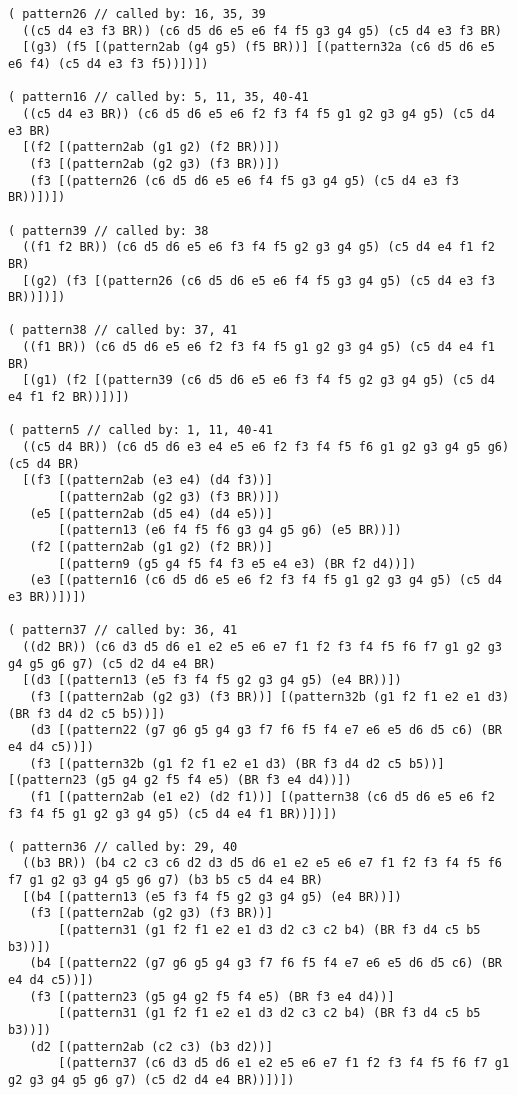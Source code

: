 {\begin{verbatim}
( pattern26 // called by: 16, 35, 39
  ((c5 d4 e3 f3 BR)) (c6 d5 d6 e5 e6 f4 f5 g3 g4 g5) (c5 d4 e3 f3 BR)
  [(g3) (f5 [(pattern2ab (g4 g5) (f5 BR))] [(pattern32a (c6 d5 d6 e5 e6 f4) (c5 d4 e3 f3 f5))])])

( pattern16 // called by: 5, 11, 35, 40-41
  ((c5 d4 e3 BR)) (c6 d5 d6 e5 e6 f2 f3 f4 f5 g1 g2 g3 g4 g5) (c5 d4 e3 BR)
  [(f2 [(pattern2ab (g1 g2) (f2 BR))])
   (f3 [(pattern2ab (g2 g3) (f3 BR))])
   (f3 [(pattern26 (c6 d5 d6 e5 e6 f4 f5 g3 g4 g5) (c5 d4 e3 f3 BR))])])

( pattern39 // called by: 38
  ((f1 f2 BR)) (c6 d5 d6 e5 e6 f3 f4 f5 g2 g3 g4 g5) (c5 d4 e4 f1 f2 BR)
  [(g2) (f3 [(pattern26 (c6 d5 d6 e5 e6 f4 f5 g3 g4 g5) (c5 d4 e3 f3 BR))])])

( pattern38 // called by: 37, 41
  ((f1 BR)) (c6 d5 d6 e5 e6 f2 f3 f4 f5 g1 g2 g3 g4 g5) (c5 d4 e4 f1 BR)
  [(g1) (f2 [(pattern39 (c6 d5 d6 e5 e6 f3 f4 f5 g2 g3 g4 g5) (c5 d4 e4 f1 f2 BR))])])

( pattern5 // called by: 1, 11, 40-41
  ((c5 d4 BR)) (c6 d5 d6 e3 e4 e5 e6 f2 f3 f4 f5 f6 g1 g2 g3 g4 g5 g6) (c5 d4 BR)
  [(f3 [(pattern2ab (e3 e4) (d4 f3))]
       [(pattern2ab (g2 g3) (f3 BR))])
   (e5 [(pattern2ab (d5 e4) (d4 e5))]
       [(pattern13 (e6 f4 f5 f6 g3 g4 g5 g6) (e5 BR))])
   (f2 [(pattern2ab (g1 g2) (f2 BR))]
       [(pattern9 (g5 g4 f5 f4 f3 e5 e4 e3) (BR f2 d4))])
   (e3 [(pattern16 (c6 d5 d6 e5 e6 f2 f3 f4 f5 g1 g2 g3 g4 g5) (c5 d4 e3 BR))])])

( pattern37 // called by: 36, 41
  ((d2 BR)) (c6 d3 d5 d6 e1 e2 e5 e6 e7 f1 f2 f3 f4 f5 f6 f7 g1 g2 g3 g4 g5 g6 g7) (c5 d2 d4 e4 BR)
  [(d3 [(pattern13 (e5 f3 f4 f5 g2 g3 g4 g5) (e4 BR))])
   (f3 [(pattern2ab (g2 g3) (f3 BR))] [(pattern32b (g1 f2 f1 e2 e1 d3) (BR f3 d4 d2 c5 b5))])
   (d3 [(pattern22 (g7 g6 g5 g4 g3 f7 f6 f5 f4 e7 e6 e5 d6 d5 c6) (BR e4 d4 c5))])
   (f3 [(pattern32b (g1 f2 f1 e2 e1 d3) (BR f3 d4 d2 c5 b5))] [(pattern23 (g5 g4 g2 f5 f4 e5) (BR f3 e4 d4))])
   (f1 [(pattern2ab (e1 e2) (d2 f1))] [(pattern38 (c6 d5 d6 e5 e6 f2 f3 f4 f5 g1 g2 g3 g4 g5) (c5 d4 e4 f1 BR))])])

( pattern36 // called by: 29, 40
  ((b3 BR)) (b4 c2 c3 c6 d2 d3 d5 d6 e1 e2 e5 e6 e7 f1 f2 f3 f4 f5 f6 f7 g1 g2 g3 g4 g5 g6 g7) (b3 b5 c5 d4 e4 BR)
  [(b4 [(pattern13 (e5 f3 f4 f5 g2 g3 g4 g5) (e4 BR))])
   (f3 [(pattern2ab (g2 g3) (f3 BR))]
       [(pattern31 (g1 f2 f1 e2 e1 d3 d2 c3 c2 b4) (BR f3 d4 c5 b5 b3))])
   (b4 [(pattern22 (g7 g6 g5 g4 g3 f7 f6 f5 f4 e7 e6 e5 d6 d5 c6) (BR e4 d4 c5))])
   (f3 [(pattern23 (g5 g4 g2 f5 f4 e5) (BR f3 e4 d4))]
       [(pattern31 (g1 f2 f1 e2 e1 d3 d2 c3 c2 b4) (BR f3 d4 c5 b5 b3))])
   (d2 [(pattern2ab (c2 c3) (b3 d2))]
       [(pattern37 (c6 d3 d5 d6 e1 e2 e5 e6 e7 f1 f2 f3 f4 f5 f6 f7 g1 g2 g3 g4 g5 g6 g7) (c5 d2 d4 e4 BR))])])


\end{verbatim}}
